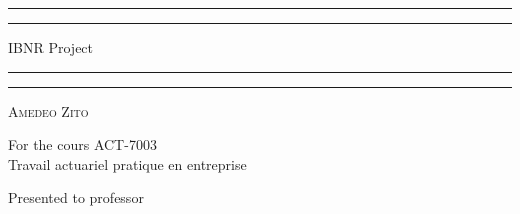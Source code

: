 	\begin{titlepage}
		\centering %
		
		\scshape %
		
		\vspace*{3\baselineskip} %
		
		
		\rule{\textwidth}{1.6pt}\vspace*{-\baselineskip}\vspace*{2pt} %
		\rule{\textwidth}{0.4pt} %
		
		\vspace{0.75\baselineskip} %
		
		{\LARGE IBNR Project\\} %
		\vspace{0.75\baselineskip} %
		
		\rule{\textwidth}{0.4pt}\vspace*{-\baselineskip}\vspace{3.2pt} %
		\rule{\textwidth}{1.6pt} %
		
		\vspace{2\baselineskip} %
		
		{\scshape\Large Amedeo Zito\\} %
		
		\vspace*{3\baselineskip}
		
		For the cours ACT-7003\\
		Travail actuariel pratique en entreprise \\%
		
		\vspace*{3\baselineskip} %
		
		
		Presented to professor
		
		\vspace{0.5\baselineskip} %
		

\end{titlepage}

